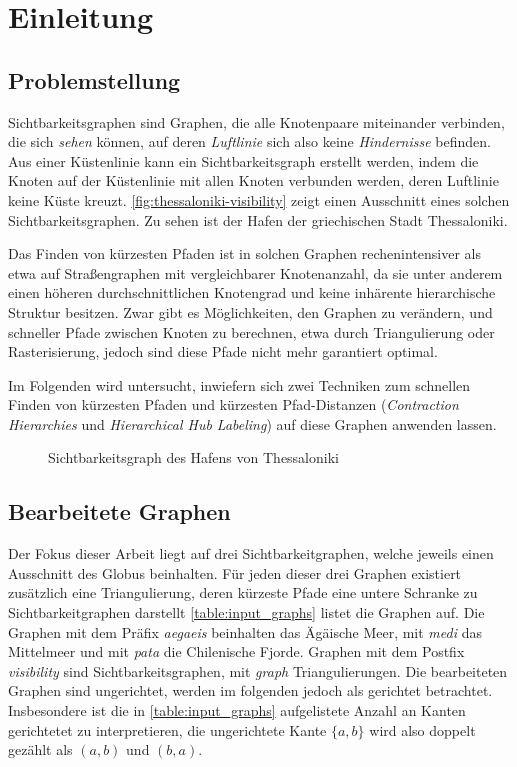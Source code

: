\chapter{Einleitung}

\section{Problemstellung}
Sichtbarkeitsgraphen sind Graphen, die alle Knotenpaare miteinander verbinden, die sich \emph{sehen} können, auf deren \emph{Luftlinie} sich also keine \emph{Hindernisse} befinden.
Aus einer Küstenlinie kann ein Sichtbarkeitsgraph erstellt werden, indem die Knoten auf der Küstenlinie mit allen Knoten verbunden werden, deren Luftlinie keine Küste kreuzt.
\autoref{fig:thessaloniki-visibility} zeigt einen Ausschnitt eines solchen Sichtbarkeitsgraphen.
Zu sehen ist der Hafen der griechischen Stadt Thessaloniki.

Das Finden von kürzesten Pfaden ist in solchen Graphen rechenintensiver als etwa auf Straßengraphen mit vergleichbarer Knotenanzahl, da sie unter anderem einen höheren durchschnittlichen Knotengrad und keine inhärente hierarchische Struktur besitzen.
Zwar gibt es Möglichkeiten, den Graphen zu verändern, und schneller Pfade zwischen Knoten zu berechnen, etwa durch Triangulierung oder Rasterisierung, jedoch sind diese Pfade nicht mehr garantiert optimal.

Im Folgenden wird untersucht, inwiefern sich zwei Techniken zum schnellen Finden von kürzesten Pfaden und kürzesten Pfad-Distanzen (\emph{Contraction Hierarchies} und \emph{Hierarchical Hub Labeling}) auf diese Graphen anwenden lassen.

\begin{figure}[ht]%
    \centering
    \caption{Sichtbarkeitsgraph des Hafens von Thessaloniki}%
    \label{fig:thessaloniki-visibility}%
\end{figure}

\section{Bearbeitete Graphen}

Der Fokus dieser Arbeit liegt auf drei Sichtbarkeitgraphen, welche jeweils einen Ausschnitt des Globus beinhalten.
Für jeden dieser drei Graphen existiert zusätzlich eine Triangulierung, deren kürzeste Pfade eine untere Schranke zu Sichtbarkeitgraphen darstellt
\autoref{table:input_graphs} listet die Graphen auf.
Die Graphen mit dem Präfix \emph{aegaeis} beinhalten das Ägäische Meer, mit \emph{medi} das Mittelmeer und mit \emph{pata} die Chilenische Fjorde.
Graphen mit dem Postfix \emph{visibility} sind Sichtbarkeitsgraphen, mit \emph{graph} Triangulierungen.
Die bearbeiteten Graphen sind ungerichtet, werden im folgenden jedoch als gerichtet betrachtet.
Insbesondere ist die in \autoref{table:input_graphs} aufgelistete Anzahl an Kanten gerichtetet zu interpretieren,
die ungerichtete Kante $\{a, b\}$ wird also doppelt gezählt als $(a, b)$ und $(b, a)$.

